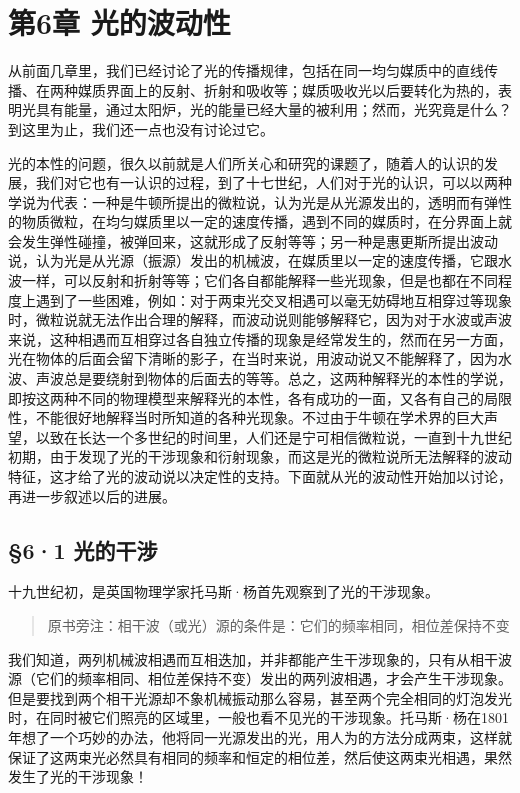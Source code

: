 \chapter{第6章
光的波动性}

从前面几章里，我们已经讨论了光的传播规律，包括在同一均匀媒质中的直线传播、在两种媒质界面上的反射、折射和吸收等；媒质吸收光以后要转化为热的，表明光具有能量，通过太阳炉，光的能量已经大量的被利用；然而，光究竟是什么？到这里为止，我们还一点也没有讨论过它。

光的本性的问题，很久以前就是人们所关心和研究的课题了，随着人的认识的发展，我们对它也有一认识的过程，到了十七世纪，人们对于光的认识，可以以两种学说为代表：一种是牛顿所提出的微粒说，认为光是从光源发出的，透明而有弹性的物质微粒，在均匀媒质里以一定的速度传播，遇到不同的媒质时，在分界面上就会发生弹性碰撞，被弹回来，这就形成了反射等等；另一种是惠更斯所提出波动说，认为光是从光源（振源）发出的机械波，在媒质里以一定的速度传播，它跟水波一样，可以反射和折射等等；它们各自都能解释一些光现象，但是也都在不同程度上遇到了一些困难，例如：对于两束光交叉相遇可以毫无妨碍地互相穿过等现象时，微粒说就无法作出合理的解释，而波动说则能够解释它，因为对于水波或声波来说，这种相遇而互相穿过各自独立传播的现象是经常发生的，然而在另一方面，光在物体的后面会留下清晰的影子，在当时来说，用波动说又不能解释了，因为水波、声波总是要绕射到物体的后面去的等等。总之，这两种解释光的本性的学说，即按这两种不同的物理模型来解释光的本性，各有成功的一面，又各有自己的局限性，不能很好地解释当时所知道的各种光现象。不过由于牛顿在学术界的巨大声望，以致在长达一个多世纪的时间里，人们还是宁可相信微粒说，一直到十九世纪初期，由于发现了光的干涉现象和衍射现象，而这是光的微粒说所无法解释的波动特征，这才给了光的波动说以决定性的支持。下面就从光的波动性开始加以讨论，再进一步叙述以后的进展。

\section{§6·1 光的干涉}

十九世纪初，是英国物理学家托马斯·杨首先观察到了光的干涉现象。

\begin{quote}
原书旁注：相干波（或光）源的条件是：它们的频率相同，相位差保持不变
\end{quote}

我们知道，两列机械波相遇而互相迭加，并非都能产生干涉现象的，只有从相干波源（它们的频率相同、相位差保持不变）发出的两列波相遇，才会产生干涉现象。但是要找到两个相干光源却不象机械振动那么容易，甚至两个完全相同的灯泡发光时，在同时被它们照亮的区域里，一般也看不见光的干涉现象。托马斯·杨在1801年想了一个巧妙的办法，他将同一光源发出的光，用人为的方法分成两束，这样就保证了这两束光必然具有相同的频率和恒定的相位差，然后使这两束光相遇，果然发生了光的干涉现象！

